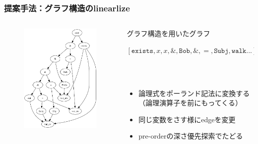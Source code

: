 \documentclass[dvipdfmx]{beamer}
\newcommand{\LF}[1]{\ensuremath{\texttt{#1}}}
\begin{document}
\begin{frame}
\frametitle{提案手法：グラフ構造のlinearlize}
\begin{columns}[t]
    \begin{column}{0.4\textwidth} %
        \begin{figure}[h]
        	\includegraphics[width=4cm]{graph.png}
                \label{fig:graph}
        \end{figure}
    \end{column}
    \begin{column}{0.6\textwidth} %
      \begin{block}{グラフ構造を用いたグラフ}
        \begin{center}
         $[\LF{exists},x,x,\&,\LF{Bob},\&,=,\LF{Subj},\LF{walk}...]$
         \end{center}
      \end{block}
      \\~\
      \begin{itemize}
        \item 論理式をポーランド記法に変換する\\（論理演算子を前にもってくる）
        \item 同じ変数をさす様にedgeを変更
        \item pre-orderの深さ優先探索でたどる
      \end{itemize}
    \end{column}
\end{columns}

\end{frame}




\end{document}

